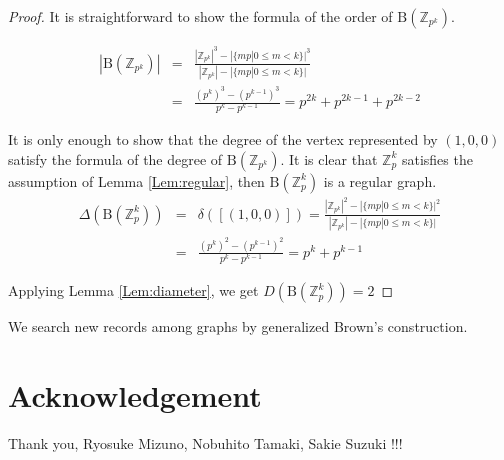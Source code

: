 \documentclass{article}
\newcommand{\Z}{\mathbb Z}
\newcommand{\B}{\mathrm{B}}
\begin{document}
\begin{proof}
It is straightforward to show the formula of the order of $\B(\Z_{p^k})$.

\begin{eqnarray*}
|\B(\Z_{p^k})| & = & \frac{|\Z_{p^k}|^3 - |\{ mp | 0 \leq m < k \}|^3}{|\Z_{p^k}|-|\{ mp | 0 \leq m < k \}|} \\ 
& = & \frac{(p^k)^3 - (p^{k-1})^3}{p^k-p^{k-1}} = p^{2k}+p^{2k-1}+p^{2k-2}
\end{eqnarray*}

It is only enough to show that the degree of the vertex represented by $(1,0,0)$ satisfy the formula of the degree of $\B(\Z_{p^k})$. 
It is clear that $\Z_p^{k}$ satisfies the assumption of Lemma \ref{Lem:regular}, then $\B(\Z_p^{k})$ is a regular graph. 
\begin{eqnarray*}
\Delta(\B(\Z_p^k)) & = & \delta([(1,0,0)]) = \frac{|\Z_{p^k}|^2 - |\{ mp | 0 \leq m < k \}|^2 }{|\Z_{p^k}|-|\{ mp | 0 \leq m < k \}|} \\
& = & \frac{(p^k)^2 - (p^{k-1})^2}{p^k-p^{k-1}} = p^k + p^{k-1}
\end{eqnarray*}

Applying Lemma \ref{Lem:diameter}, we get $D(\B(\Z_p^k)) = 2$

\end{proof}

We search new records among graphs by generalized Brown's construction.


\section{Acknowledgement}
Thank you, Ryosuke Mizuno, Nobuhito Tamaki, Sakie Suzuki !!!



\end{document}
